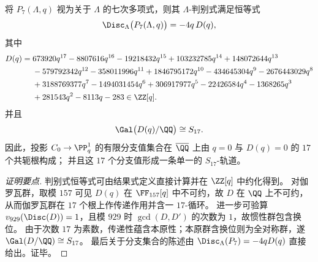 \begin{theorem}\label{thm:real-input-40-p7-discriminant-branch-s17}
将 \(P_7(\Lambda,q)\) 视为关于 \(\Lambda\) 的七次多项式，则其 \(\Lambda\)-判别式满足恒等式
\[
\Disc_{\Lambda}\bigl(P_7(\Lambda,q)\bigr)=-4q\,D(q),
\]
其中
\[
\begin{aligned}
D(q)=\;&673920q^{17}-8807616q^{16}-19218432q^{15}+103232785q^{14}+148072644q^{13}\\
&-579792342q^{12}-358011996q^{11}+1846795172q^{10}-434645304q^{9}-2676443029q^{8}\\
&+3188769377q^{7}-1494031454q^{6}+306917977q^{5}-22426584q^{4}-1368265q^{3}\\
&+281543q^{2}-8113q-283\in\ZZ[q].
\end{aligned}
\]
并且
\[
\Gal\bigl(D(q)/\QQ\bigr)\cong S_{17}.
\]
因此，投影 \(C_0\to\PP^1_q\) 的有限分支值集合在 \(\overline{\QQ}\) 上由 \(q=0\) 与 \(D(q)=0\) 的 \(17\) 个共轭根构成；
并且这 \(17\) 个分支值形成一条单一的 \(S_{17}\)-轨道。
\end{theorem}
\begin{proof}[证明要点]
判别式恒等式可由结果式定义直接计算并在 \(\ZZ[q]\) 中约化得到。
对伽罗瓦群，取模 \(157\) 可见 \(D(q)\) 在 \(\FF_{157}[q]\) 中不可约，故 \(D\) 在 \(\QQ\) 上不可约，从而伽罗瓦群在 \(17\) 个根上作传递作用并含一 \(17\)-循环。
进一步可验算 \(v_{929}(\Disc(D))=1\)，且模 \(929\) 时 \(\gcd(D,D')\) 的次数为 \(1\)，故惯性群包含换位。
由于次数 \(17\) 为素数，传递性蕴含本原性；本原群含换位则为全对称群，遂 \(\Gal(D/\QQ)\cong S_{17}\)。
最后关于分支集合的陈述由 \(\Disc_{\Lambda}(P_7)=-4qD(q)\) 直接给出。证毕。
\end{proof}

